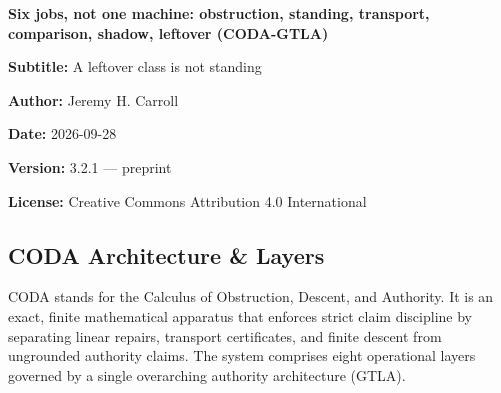 \documentclass[
  11pt,
]{article}
\begin{document}
\begin{center}
{\Large\bfseries Six jobs, not one machine: obstruction, standing, transport, comparison, shadow, leftover (CODA-GTLA)}\par
\textbf{Subtitle:} A leftover class is not standing

\textbf{Author:} Jeremy H. Carroll

\textbf{Date:} 2026-09-28

\textbf{Version:} 3.2.1 --- preprint

\textbf{License:} Creative Commons Attribution 4.0 International

\end{center}

\subsection{CODA Architecture \& Layers}\label{coda-architecture-layers}

CODA stands for the Calculus of Obstruction, Descent, and Authority. It is an exact, finite mathematical apparatus that enforces strict claim discipline by separating linear repairs, transport certificates, and finite descent from ungrounded authority claims. The system comprises eight operational layers governed by a single overarching authority architecture (GTLA).
\end{document}
